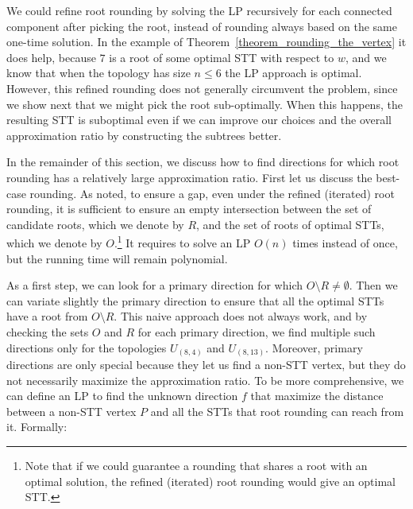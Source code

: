 We could refine root rounding by solving the LP recursively for each connected component after picking the root, instead of rounding always based on the same one-time solution. In the example of Theorem~\ref{theorem_rounding_the_vertex} it does help, because $7$ is a root of some optimal STT with respect to $w$, and we know that when the topology has size $n \le 6$ the LP approach is optimal. However, this refined rounding does not generally circumvent the problem, since we show next that we might pick the root sub-optimally. When this happens, the resulting STT is suboptimal even if we can improve our choices and the overall approximation ratio by constructing the subtrees better.

\medskip

In the remainder of this section, we discuss how to find directions 
for which root rounding has a
relatively large approximation ratio. First let us discuss the best-case rounding. As noted, to ensure a gap, even under the refined (iterated) root rounding, it is sufficient to ensure an empty intersection between the set of candidate roots, which we denote by $R$, and the set of roots of optimal STTs, which we denote by $O$.\footnote{Note that if we could guarantee a rounding that shares a root with an optimal solution, the refined (iterated) root rounding would give an optimal STT.} It  requires  to solve an LP $O(n)$ times instead of once, but the running time will remain polynomial.

As a first step, we can look for a primary direction for which $O \setminus R \ne \emptyset$. Then we can variate slightly the primary direction to ensure that all the optimal STTs have a root from $O \setminus R$. This naive approach does not always work, and by checking the sets $O$ and $R$ for each primary direction, we find multiple such directions only for the topologies $U_{(8,4)}$ and $U_{(8,13)}$.
Moreover, primary directions are only special because they let us find a non-STT vertex, but they do not necessarily maximize the approximation ratio. To be more comprehensive, we can define an LP to find the unknown direction $f$ that maximize the distance between a non-STT vertex $P$ and all the STTs that root rounding can reach from it. Formally:

